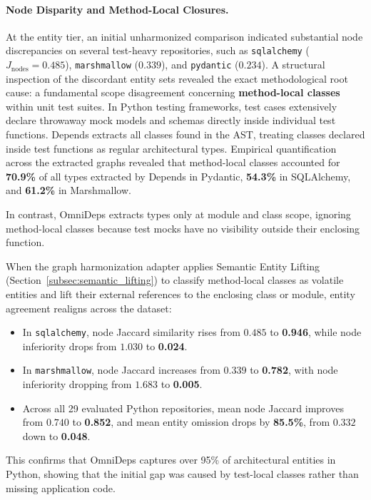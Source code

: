 \paragraph{Node Disparity and Method-Local Closures.}
At the entity tier, an initial unharmonized comparison indicated substantial
node discrepancies on several test-heavy repositories, such as
\texttt{sqlalchemy} ($J_{\text{nodes}} = 0.485$), \texttt{marshmallow}
($0.339$), and \texttt{pydantic} ($0.234$). A structural inspection of the
discordant entity sets revealed the exact methodological root cause: a
fundamental scope disagreement concerning \textbf{method-local classes} within
unit test suites. In Python testing frameworks, test cases extensively declare
throwaway mock models and schemas directly inside individual test functions.
Depends extracts all classes found in the AST, treating classes declared
inside test functions as regular architectural types. Empirical
quantification across the extracted graphs revealed that method-local classes
accounted for \textbf{70.9\%} of all types extracted by Depends in Pydantic,
\textbf{54.3\%} in SQLAlchemy, and \textbf{61.2\%} in Marshmallow.

In contrast, OmniDeps extracts types only at module and class scope, ignoring
method-local classes because test mocks have no visibility outside their
enclosing function.

When the graph harmonization adapter applies Semantic Entity Lifting
(Section~\ref{subsec:semantic_lifting}) to classify method-local classes as
volatile entities and lift their external references to the enclosing class or
module, entity agreement realigns across the dataset:
\begin{itemize}
  \item In \texttt{sqlalchemy}, node Jaccard similarity rises from $0.485$ to
    \textbf{0.946}, while node inferiority drops from $1.030$ to \textbf{0.024}.
  \item In \texttt{marshmallow}, node Jaccard increases from $0.339$ to
    \textbf{0.782}, with node inferiority dropping from $1.683$ to
    \textbf{0.005}.
  \item Across all 29 evaluated Python repositories, mean node Jaccard improves
    from $0.740$ to \textbf{0.852}, and mean entity omission drops by
    \textbf{85.5\%}, from $0.332$ down to \textbf{0.048}.
\end{itemize}
This confirms that OmniDeps captures over 95\% of architectural entities in
Python, showing that the initial gap was caused by test-local classes
rather than
missing application code.

